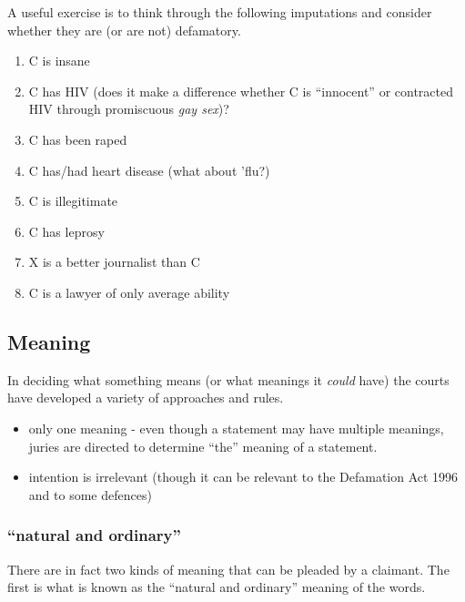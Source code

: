\documentclass[]{article}
\begin{document}
A useful exercise is to think through the following imputations and
consider whether they are (or are not) defamatory.

\begin{enumerate}
\item
  C is insane
\item
  {C has HIV (does it make a difference whether C is ``innocent'' or
  contracted HIV through promiscuous }\emph{{gay sex}}{{)?}}
\item
  C has been raped
\item
  C has/had heart disease (what about 'flu?)
\item
  C is illegitimate
\item
  C has leprosy
\item
  X is a better journalist than C
\item
  C is a lawyer of only average ability
\end{enumerate}

\subsection{Meaning}

{In deciding what something means (or what meanings it }\emph{{could
}}{{have) the courts have developed a variety of approaches and rules.}}

\begin{itemize}
\item
  only one meaning - even though a statement may have multiple meanings,
  juries are directed to determine ``the'' meaning of a statement.
\item
  intention is irrelevant (though it can be relevant to the Defamation
  Act 1996 and to some defences)
\end{itemize}

\subsubsection{\texorpdfstring{``natural and
ordinary''}{natural and ordinary}}

There are in fact two kinds of meaning that can be pleaded by a
claimant. The first is what is known as the ``natural and ordinary''
meaning of the words.
\end{document}
